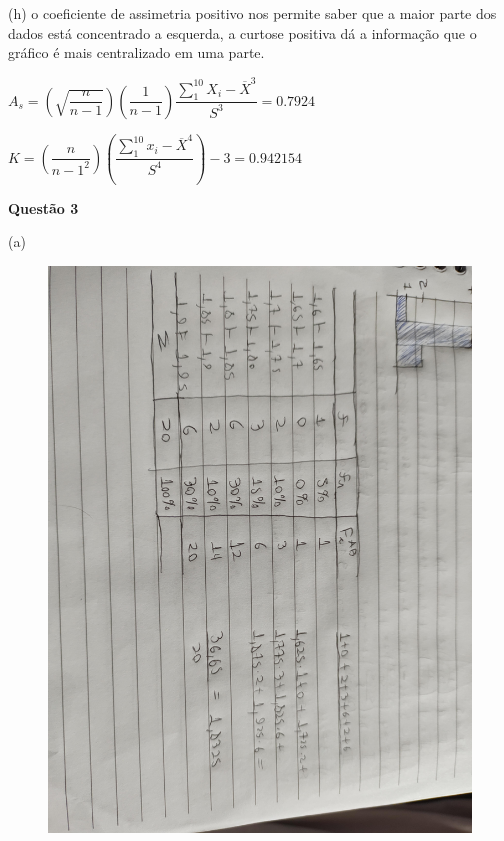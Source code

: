 \documentclass[12pt]{article}   %
\begin{document}
\par (h) o coeficiente de assimetria positivo nos permite saber que a maior parte dos dados está concentrado a esquerda, a curtose positiva dá a informação que o gráfico é mais centralizado em uma parte.
\vspace{+6pt}
\par $A_s = (\sqrt{\dfrac{n}{n-1}})(\dfrac{1}{n-1})\dfrac{\sum_{1}^{10}{X_i-\overline{X}}^3}{S^3} = 0.7924$
\vspace{+6pt}
\par $ K = (\dfrac{n}{{n-1}^2})(\dfrac{\sum_{1}^{10}{x_i-\overline{X}}^4}{S^4}) - 3 = 0.942154$
\vspace{+12pt}
\par \textbf{Questão 3}
\vspace{+12pt}
\par (a)
	\begin{figure}[h!]
		\includegraphics[scale=0.07]{q3a}
	\end{figure}
\end{document}
